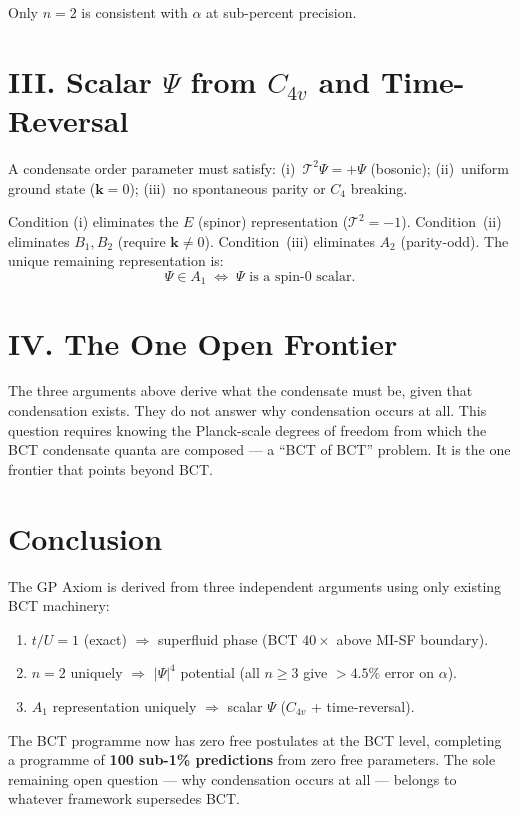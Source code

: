 \documentclass[10pt,twocolumn]{article}
\begin{document}
Only $n = 2$ is consistent with $\alpha$ at sub-percent precision.

\section{III.\; Scalar $\Psi$ from $C_{4v}$ and Time-Reversal}

A condensate order parameter must satisfy: (i)~$\mathcal{T}^2\Psi = +\Psi$ (bosonic);
(ii)~uniform ground state ($\mathbf{k} = 0$); (iii)~no spontaneous parity or $C_4$ breaking.

Condition (i) eliminates the $E$ (spinor) representation ($\mathcal{T}^2 = -1$). Condition~(ii)
eliminates $B_1, B_2$ (require $\mathbf{k} \neq 0$). Condition~(iii) eliminates $A_2$
(parity-odd). The unique remaining representation is:
\begin{equation}
\Psi \in A_1 \;\iff\; \Psi \text{ is a spin-0 scalar.}
\label{eq:A1}
\end{equation}

\section{IV.\; The One Open Frontier}

The three arguments above derive what the condensate must be, given that condensation exists.
They do not answer why condensation occurs at all. This question requires knowing the Planck-scale
degrees of freedom from which the BCT condensate quanta are composed --- a ``BCT of BCT'' problem.
It is the one frontier that points beyond BCT.

\section{Conclusion}

The GP Axiom is derived from three independent arguments using only existing BCT machinery:
\begin{enumerate}\setlength\itemsep{1pt}
\item $t/U = 1$ (exact) $\Rightarrow$ superfluid phase (BCT $40\times$ above MI-SF boundary).
\item $n = 2$ uniquely $\Rightarrow$ $|\Psi|^4$ potential (all $n \geq 3$ give $> 4.5\%$ error on $\alpha$).
\item $A_1$ representation uniquely $\Rightarrow$ scalar $\Psi$ ($C_{4v}$ + time-reversal).
\end{enumerate}

The BCT programme now has zero free postulates at the BCT level, completing a programme of
\textbf{100 sub-1\% predictions} from zero free parameters. The sole remaining open question
--- why condensation occurs at all --- belongs to whatever framework supersedes BCT.
\end{document}

